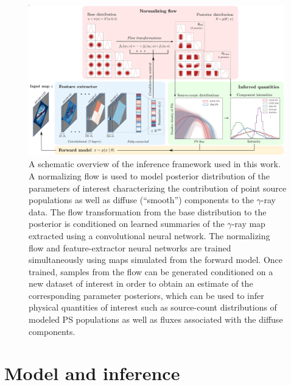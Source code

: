 \documentclass[]{article}
\begin{document}
%
\begin{figure}
\includegraphics[width=0.99\textwidth]{figures/figure.pdf} 
\caption{A schematic overview of the inference framework used in this work. A normalizing flow is used to model posterior distribution of the parameters of interest characterizing the contribution of point source populations as well as diffuse (``smooth'') components to the $\gamma$-ray data. The flow transformation from the base distribution to the posterior is conditioned on learned summaries of the $\gamma$-ray map extracted using a convolutional neural network. The normalizing flow and feature-extractor neural networks are trained simultaneously using maps simulated from the forward model. Once trained, samples from the flow can be generated conditioned on a new dataset of interest in order to obtain an estimate of the corresponding parameter posteriors, which can be used to infer physical quantities of interest such as source-count distributions of modeled PS populations as well as fluxes associated with the diffuse components. }
\label{fig:figure}
\end{figure}
%

\section{Model and inference}
\label{sec:model}
\end{document}
